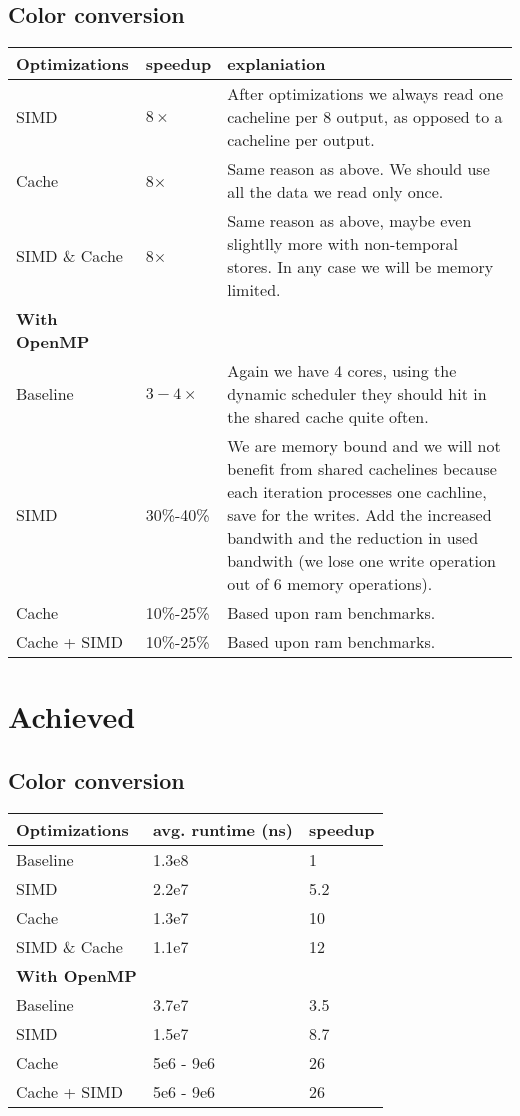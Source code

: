 \documentclass{article}
\begin{document}
\subsection{Color conversion}
\begin{tabular*}{1.1 \textwidth}{|p{}||p{}|p{}|}
  \bf Optimizations & \bf speedup & \bf explaniation \\ \hline
SIMD & $8\times$ & After optimizations we always read one cacheline per 8 output, as opposed to a cacheline per output.
\\ \hline Cache & 8$\times$ & Same reason as above. We should use all the data we read only once.
\\ \hline SIMD \& Cache & 8$\times$ & Same reason as above, maybe even slightlly more with non-temporal stores. In any case we will be memory limited.
\\ \hline \bf With OpenMP &&
\\ \hline Baseline & $3-4\times$ & Again we have 4 cores, using the dynamic scheduler they should hit in the shared cache quite often.
\\ \hline SIMD & 30\%-40\% & We are memory bound and we will not benefit from shared cachelines because each iteration processes one cachline, save for the writes. Add the increased bandwith and the reduction in used bandwith (we lose one write operation out of 6 memory operations).
\\ \hline Cache & 10\%-25\%& Based upon ram benchmarks.
\\ \hline Cache + SIMD & 10\%-25\% & Based upon ram benchmarks. \\ \hline
\end{tabular*}

\section{Achieved}
\subsection{Color conversion}
\begin{tabular*}{1.05 \textwidth}{|p{}||p{}|p{}}
  \bf Optimizations  & \bf avg. runtime (ns) & \bf speedup
\\ \hline Baseline & 1.3e8 & 1
\\ \hline SIMD & 2.2e7 & 5.2
\\ \hline Cache & 1.3e7 & 10
\\ \hline SIMD \& Cache & 1.1e7 & 12
\\ \hline \bf With OpenMP &&
\\ \hline Baseline & 3.7e7 & 3.5
\\ \hline SIMD & 1.5e7 & 8.7
\\ \hline Cache & 5e6 - 9e6 & 26
\\ \hline Cache + SIMD & 5e6 - 9e6 & 26
\end{tabular*}
\end{document}
